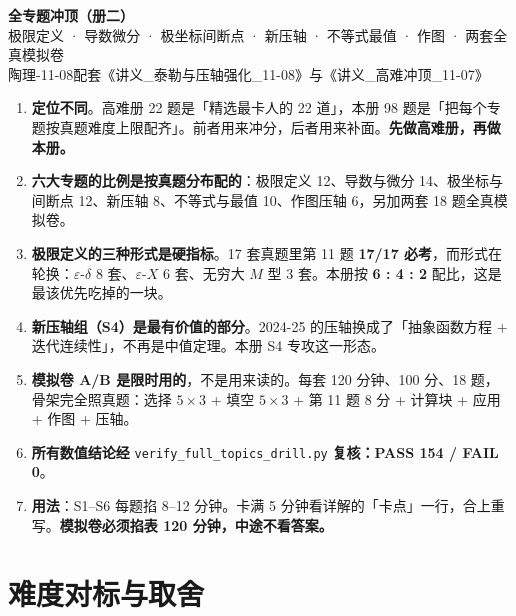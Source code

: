 \documentclass[11pt,a4paper]{ctexart}
\newcommand{\eps}{\varepsilon}
\begin{document}
\begin{center}
{\LARGE\bfseries 全专题冲顶（册二）}\\[4pt]
{\large 极限定义 · 导数微分 · 极坐标间断点 · 新压轴 · 不等式最值 · 作图 · 两套全真模拟卷}\\[4pt]
{\small 陶理-11-08\quad 配套《讲义\_泰勒与压轴强化\_11-08》与《讲义\_高难冲顶\_11-07》}
\end{center}

\begin{keypoint}[这本册子怎么用]
\begin{enumerate}
\item \textbf{定位不同}。高难册 22 题是「精选最卡人的 22 道」，本册 98 题是「把每个专题按真题难度上限配齐」。前者用来冲分，后者用来补面。\textbf{先做高难册，再做本册。}
\item \textbf{六大专题的比例是按真题分布配的}：极限定义 12、导数与微分 14、极坐标与间断点 12、新压轴 8、不等式与最值 10、作图压轴 6，另加两套 18 题全真模拟卷。
\item \textbf{极限定义的三种形式是硬指标}。17 套真题里第 11 题 \textbf{17/17 必考}，而形式在轮换：$\eps$-$\delta$ 8 套、$\eps$-$X$ 6 套、无穷大 $M$ 型 3 套。本册按 \textbf{6 : 4 : 2} 配比，这是最该优先吃掉的一块。
\item \textbf{新压轴组（S4）是最有价值的部分}。2024-25 的压轴换成了「抽象函数方程 + 迭代连续性」，不再是中值定理。本册 S4 专攻这一形态。
\item \textbf{模拟卷 A/B 是限时用的}，不是用来读的。每套 120 分钟、100 分、18 题，骨架完全照真题：选择 $5\times3$ + 填空 $5\times3$ + 第 11 题 8 分 + 计算块 + 应用 + 作图 + 压轴。
\item \textbf{所有数值结论经} \texttt{verify\_full\_topics\_drill.py} \textbf{复核：PASS 154 / FAIL 0}。
\item \textbf{用法}：S1--S6 每题掐 8--12 分钟。卡满 5 分钟看详解的「卡点」一行，合上重写。\textbf{模拟卷必须掐表 120 分钟，中途不看答案。}
\end{enumerate}
\end{keypoint}

\section{难度对标与取舍}
\end{document}
